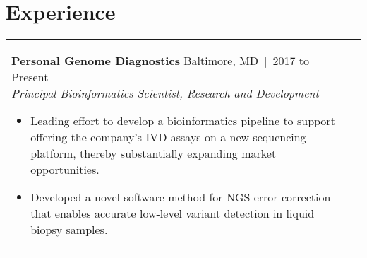 \documentclass[11pt,letter,sans]{moderncv}
\makeatletter
\newenvironment{entrylistFive}{%
  \begin{longtable}{@{\extracolsep{\fill}}ll}
}{%
  \end{longtable}
}
\newcommand{\entryFive}[5]{%
  \parbox[t]{170mm}{%
    \textbf{#2}%
    \hfill%
    {\footnotesize #3~|~#1}\\%
	\emph{#4}\\%
    #5\vspace{\parsep}%
  }\\}
\makeatother
\begin{document}
\section{Experience}
\begin{entrylistFive}
\entryFive
{2017 to Present}
{Personal Genome Diagnostics}
{Baltimore, MD}
{Principal Bioinformatics Scientist, Research and Development}
{\vspace{-5mm}
\begin{itemize}
\item {Leading effort to develop a bioinformatics pipeline to support offering the company's IVD assays on a new sequencing platform, thereby substantially expanding market opportunities.}
\item {Developed a novel software method for NGS error correction that enables accurate low-level variant detection in liquid biopsy samples.}
\end{itemize}
}

\entryFive
{2014 to 2017}
{National Human Genome Research Institute}
{Bethesda, MD}
{Postdoctoral Fellow, Laboratory of Dr. Francis S Collins}
{\vspace{-5mm}
\begin{itemize}
\item {Leveraged a large, multi-omics dataset to investigate epigenetic mechanisms underlying regulatory variants implicated in type 2 diabetes.}
\item {Developed machine-learning approaches for imputation of missing data in multi-omics experiments.}
\item {Investigated cell-to-cell variability in pancreatic islets, including responses to environmental perturbation, using single-cell gene expression and chromatin accessibility data.}
\item {Designed a novel sequencing assay for single-molecule resolution transcriptome analysis.}
\item {Developed Atropos, user-friendly software for QC and pre-processing of NGS reads. Created reproducible benchmark pipeline using software containers for accompanying publication.}
\item {Initiated collaborative project to undestand genomic diversity of biofilm communities.}
\item {Awarded six grants, including an American Diabetes Association fellowship and an NIH K22.}
\end{itemize}
}

\entryFive
{2016 to Present}
{American Academy of Bioinformatics}
{Bethesda, MD}
{Instructor of Bioinformatics}
{\vspace{-5mm}
\begin{itemize}
\item {Developed comprehensive, open-source course materials for workshops in DNA-Seq and RNA-Seq data analysis.}
\item {Taught workshops and earned highly positive student reviews.}
\end{itemize}
}


\end{entrylistFive}
\end{document}

